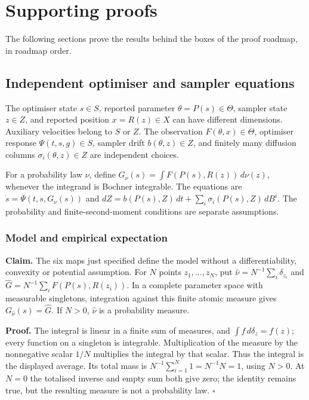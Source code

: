 \documentclass[11pt,a4paper]{report}
\begin{document}
\chapter{Supporting proofs}
The following sections prove the results behind the boxes of the proof roadmap, in roadmap order.

\section{\texorpdfstring{Independent optimiser and sampler equations}{Independent optimiser and sampler equations}}


The optimiser state \(s\in S\), reported parameter \(\theta=P(s)\in\Theta\), sampler state \(z\in Z\), and reported position \(x=R(z)\in X\) can have different dimensions. Auxiliary velocities belong to \(S\) or \(Z\). The observation \(F(\theta,x)\in\Theta\), optimiser response \(\Psi(t,s,g)\in S\), sampler drift \(b(\theta,z)\in Z\), and finitely many diffusion columns \(\sigma_i(\theta,z)\in Z\) are independent choices.



For a probability law \(\nu\), define \(G_\nu(s)=\int F(P(s),R(z))\,d\nu(z)\), whenever the integrand is Bochner integrable. The equations are \(\dot s=\Psi(t,s,G_\nu(s))\) and \(dZ=b(P(s),Z)\,dt+\sum_i\sigma_i(P(s),Z)\,dB^i\). The probability and finite-second-moment conditions are separate assumptions.

\subsection{\texorpdfstring{Model and empirical expectation}{Model and empirical expectation}}


\textbf{Claim.} The six maps just specified define the model without a differentiability, convexity or potential assumption. For \(N\) points \(z_1,\ldots,z_N\), put \(\widehat\nu=N^{-1}\sum_i\delta_{z_i}\) and \(\widehat G=N^{-1}\sum_iF(P(s),R(z_i))\). In a complete parameter space with measurable singletons, integration against this finite atomic measure gives \(G_{\widehat\nu}(s)=\widehat G\). If \(N>0\), \(\widehat\nu\) is a probability measure.



\textbf{Proof.} The integral is linear in a finite sum of measures, and \(\int f\,d\delta_z=f(z)\); every function on a singleton is integrable. Multiplication of the measure by the nonnegative scalar \(1/N\) multiplies the integral by that scalar. Thus the integral is the displayed average. Its total mass is \(N^{-1}\sum_{i=1}^N1=N^{-1}N=1\), using \(N>0\). At \(N=0\) the totalised inverse and empty sum both give zero; the identity remains true, but the resulting measure is not a probability law. \(\square\)
\end{document}
